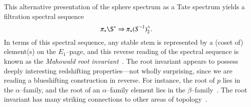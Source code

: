 This alternative presentation of the sphere spectrum as a Tate spectrum yields a filtration spectral sequence \[\pi_* \S^* \Rightarrow \pi_* (S^{-1})^\wedge_2.\]  In terms of this spectral sequence, any stable stem is represented by a (coset of) element(s) on the $E_1$--page, and this reverse reading of the spectral sequence is known as the \textit{Mahowald root invariant}~\cite{MahowaldShick}.  The root invariant appears to possess deeply interesting redshifting properties---not wholly surprising, since we are reading a blueshifting construction in reverse.  For instance, the root of $p$ lies in the $\alpha$--family, and the root of an $\alpha$--family element lies in the $\beta$--family~\cite{BehrensRootInv}.  The root invariant has many striking connections to other areas of topology~\cite{MahowaldRavenel}.

